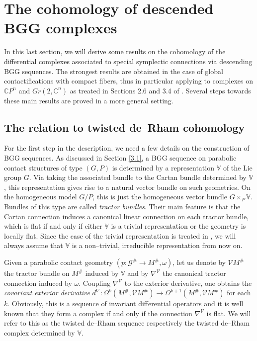 \documentclass[12pt,a4paper]{amsart}
\def\Bbb{\mathbb}
\def\Cal{\mathcal}
\newcommand{\x}{\times}
\newcommand{\om}{\omega}
\newcommand{\Om}{\Omega}
\numberwithin{theorem}{section}
\theoremstyle{definition}
\theoremstyle{remark}
\begin{document}
\section{The cohomology of descended BGG complexes}\label{4} 
In this last section, we will derive some results on the cohomology of
the differential complexes associated to special symplectic
connections via descending BGG sequences. The strongest results are
obtained in the case of global contactifications with compact fibers,
thus in particular applying to complexes on $\Bbb CP^n$ and
$Gr(2,\Bbb C^n)$ as treated in Sections 2.6 and 3.4 of
\cite{PCS2}. Several steps towards these main results are proved in a
more general setting.

\subsection{The relation to twisted de--Rham cohomology}\label{4.1} 
For the first step in the description, we need a few details on the
construction of BGG sequences. As discussed in Section \ref{3.1}, a
BGG sequence on parabolic contact structures of type $(G,P)$ is
determined by a representation $\Bbb V$ of the Lie group $G$. Via
taking the associated bundle to the Cartan bundle determined by $\Bbb
V$, this representation gives rise to a natural vector bundle on such
geometries. On the homogeneous model $G/P$, this is just the
homogeneous vector bundle $G\x_P\Bbb V$. Bundles of this type are
called \textit{tractor bundles}. Their main feature is that the
Cartan connection induces a canonical linear connection on each
tractor bundle, which is flat if and only if either $\Bbb V$ is a
trivial representation or the geometry is locally flat. Since the case
of the trivial representation is treated in \cite{Cap-Salac}, we will
always assume that $\Bbb V$ is a non--trivial, irreducible
representation from now on.

Given a parabolic contact geometry $(p:\Cal G^\#\to M^\#,\om)$, let us
denote by $\Cal VM^\#$ the tractor bundle on $M^\#$ induced by $\Bbb
V$ and by $\nabla^{\Cal V}$ the canonical tractor connection induced
by $\om$. Coupling $\nabla^{\Cal V}$ to the exterior derivative, one
obtains the \textit{covariant exterior derivative}
$d^\nabla:\Om^k(M^\#,\Cal VM^\#)\to\Om^{k+1}(M^\#,\Cal VM^\#)$ for
each $k$. Obviously, this is a sequence of invariant differential
operators and it is well known that they form a complex if and only if
the connection $\nabla^{\Cal V}$ is flat. We will refer to this as the
twisted de--Rham sequence respectively the twisted de--Rham complex
determined by $\Bbb V$.
\end{document}
